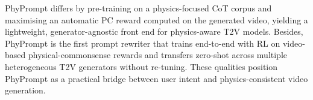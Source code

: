 PhyPrompt differs by pre-training on a physics-focused CoT corpus and maximising an automatic PC reward computed on the generated video, yielding a lightweight, generator-agnostic front end for physics-aware T2V models.
Besides, PhyPrompt is the first prompt rewriter that trains end-to-end with RL on video-based physical-commonsense rewards and transfers zero-shot across multiple heterogeneous T2V generators without re-tuning.
These qualities position PhyPrompt as a practical bridge between user intent and physics-consistent video generation.
